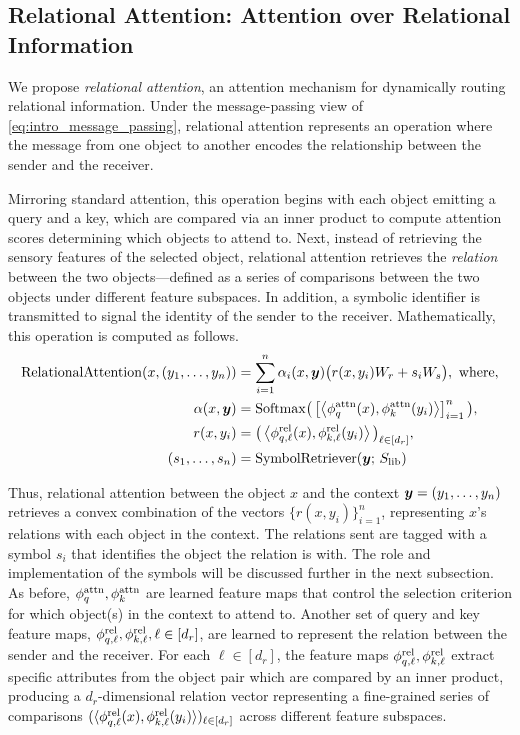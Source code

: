 \subsection{Relational Attention: Attention over Relational Information}

We propose \textit{relational attention}, an attention mechanism for dynamically routing relational information. Under the message-passing view of \cref{eq:intro_message_passing}, relational attention represents an operation where the message from one object to another encodes the relationship between the sender and the receiver.

Mirroring standard attention, this operation begins with each object emitting a query and a key, which are compared via an inner product to compute attention scores determining which objects to attend to. Next, instead of retrieving the sensory features of the selected object, relational attention retrieves the \textit{relation} between the two objects---defined as a series of comparisons between the two objects under different feature subspaces. In addition, a symbolic identifier is transmitted to signal the identity of the sender to the receiver. Mathematically, this operation is computed as follows.
\begin{equation}\label{eq:rel_attn}
  \begin{split}
    \mathrm{RelationalAttention}(x, (y_1, \ldots, y_n)) &= \sum_{i=1}^{n} \alpha_i(x, \bm{y}) \big(r(x, y_i) W_r + s_i W_s\big), \ \text{where},\\
    \alpha(x, \bm{y}) &= \mathrm{Softmax}\big(\left[\left \langle \phi_q^{\mathrm{attn}}(x), \phi_k^{\mathrm{attn}}(y_i) \right\rangle\right]_{i=1}^{n}\big), \\
    r(x, y_i) &= \big(\left \langle \phi_{q, \ell}^{\mathrm{rel}}(x), \phi_{k, \ell}^{\mathrm{rel}}(y_i) \right\rangle\big)_{\ell \in [d_r]}, \\
    (s_1, \ldots, s_n) &= \mathrm{SymbolRetriever}(\bm{y};\,S_\mathrm{lib})
  \end{split}
\end{equation}

Thus, relational attention between the object $x$ and the context $\bm{y} = (y_1, \ldots, y_n)$ retrieves a convex combination of the vectors $\{r(x, y_i)\}_{i=1}^{n}$, representing $x$'s relations with each object in the context. The relations sent are tagged with a symbol $s_i$ that identifies the object the relation is with. The role and implementation of the symbols will be discussed further in the next subsection. As before, $\phi_q^{\mathrm{attn}}, \phi_k^{\mathrm{attn}}$ are learned feature maps that control the selection criterion for which object(s) in the context to attend to. Another set of query and key feature maps, $\phi_{q, \ell}^{\mathrm{rel}}, \phi_{k, \ell}^{\mathrm{rel}}, \ell \in [d_r]$, are learned to represent the relation between the sender and the receiver. For each $\ell \in [d_r]$, the feature maps $\phi_{q, \ell}^{\mathrm{rel}}, \phi_{k, \ell}^{\mathrm{rel}}$ extract specific attributes from the object pair which are compared by an inner product, producing a $d_r$-dimensional relation vector representing a fine-grained series of comparisons $(\langle \phi_{q, \ell}^{\mathrm{rel}}(x), \phi_{k, \ell}^{\mathrm{rel}}(y_i) \rangle)_{\ell \in [d_r]}$ across different feature subspaces.

